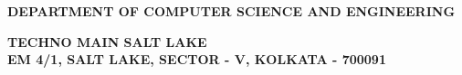 \begin{titlepage}
\begin{center}
        \vspace{2\baselineskip}
        
        {\large \bf \MakeUppercase{Department of Computer Science and Engineering} \par}
        \vspace{1ex}
        {\large \bf \uppercase{Techno Main Salt Lake\\
        EM 4/1, Salt Lake, Sector - V, Kolkata - 700091} \par}
    
    \vspace*{\fill} %
    
    \end{center}
\end{titlepage}
    